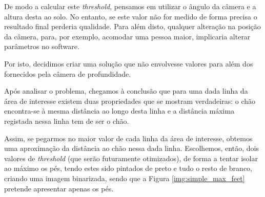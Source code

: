 \documentclass[a4paper]{report}
\begin{document}
De modo a calcular este \textit{threshold}, pensamos em utilizar o ângulo da câmera e a altura
desta ao solo. No entanto, se este valor não for medido de forma precisa o resultado
final perderia qualidade. Para além disto, qualquer alteração na posição da câmera, para,
por exemplo, acomodar uma pessoa maior, implicaria alterar parâmetros no software.

Por isto, decidimos criar uma solução que não envolvesse valores para além dos fornecidos
pela câmera de profundidade. 

Após analisar o problema, chegamos à conclusão que para uma
dada linha da área de interesse existem duas propriedades que se mostram verdadeiras:
o chão encontra-se à mesma distância ao longo desta linha e a distância máxima registada
nessa linha tem de ser o chão.

Assim, se pegarmos no maior valor de cada linha da área de interesse, obtemos uma
aproximação da distância ao chão nessa dada linha. Escolhemos, então, dois valores de
\textit{threshold} (que serão futuramente otimizados), de forma a tentar isolar ao máximo
os pés, tendo estes sido pintados de preto e tudo o resto de branco, criando uma imagem binarizada,
sendo que a Figura \ref{img:simple_max_feet} pretende apresentar apenas os pés. 
\end{document}
